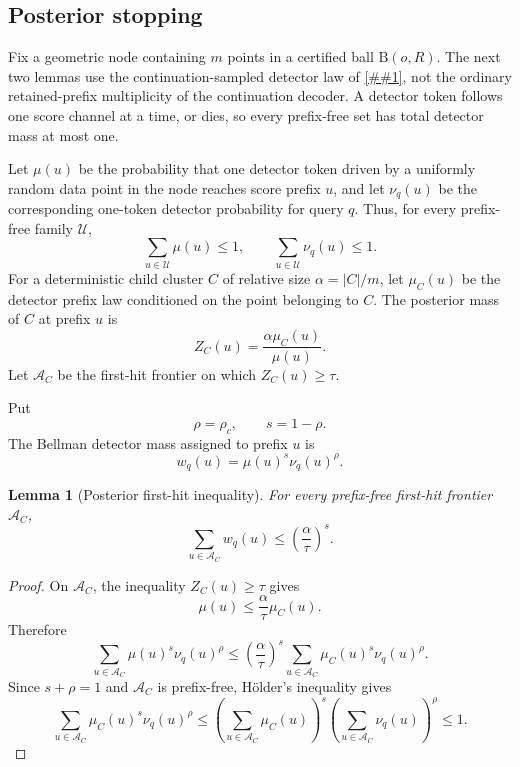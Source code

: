 \documentclass[10pt]{article}
\newcommand{\cref}[1]{\ref{##1}}
\newtheorem{lemma}[theorem]{Lemma}
\theoremstyle{definition}
\newcommand{\Ball}{\mathrm{B}}
\begin{document}
\subsection{Posterior stopping}

Fix a geometric node containing $m$ points in a certified ball $\Ball(o,R)$. The next two lemmas use the continuation-sampled detector law of \cref{lem:continuation-detector}, not the ordinary retained-prefix multiplicity of the continuation decoder. A detector token follows one score channel at a time, or dies, so every prefix-free set has total detector mass at most one.

Let $\mu(u)$ be the probability that one detector token driven by a uniformly random data point in the node reaches score prefix $u$, and let $\nu_q(u)$ be the corresponding one-token detector probability for query $q$. Thus, for every prefix-free family $\mathcal U$,
\[
   \sum_{u\in\mathcal U}\mu(u)\le1,
   \qquad
   \sum_{u\in\mathcal U}\nu_q(u)\le1.
\]
For a deterministic child cluster $C$ of relative size $\alpha=|C|/m$, let $\mu_C(u)$ be the detector prefix law conditioned on the point belonging to $C$. The posterior mass of $C$ at prefix $u$ is
\[
   Z_C(u)=\frac{\alpha\mu_C(u)}{\mu(u)}.
\]
Let $\mathcal A_C$ be the first-hit frontier on which $Z_C(u)\ge\tau$.

Put
\[
   \rho=\rho_c,
   \qquad
   s=1-\rho.
\]
The Bellman detector mass assigned to prefix $u$ is
\[
   w_q(u)=\mu(u)^s\nu_q(u)^\rho.
\]

\begin{lemma}[Posterior first-hit inequality]\label{lem:first-hit}
   For every prefix-free first-hit frontier $\mathcal A_C$,
   \[
      \sum_{u\in\mathcal A_C} w_q(u)
      \le
      \left(\frac{\alpha}{\tau}\right)^s.
   \]
\end{lemma}

\begin{proof}
   On $\mathcal A_C$, the inequality $Z_C(u)\ge\tau$ gives
   \[
      \mu(u)\le \frac{\alpha}{\tau}\mu_C(u).
   \]
   Therefore
   \[
      \sum_{u\in\mathcal A_C}\mu(u)^s\nu_q(u)^\rho
      \le
      \left(\frac{\alpha}{\tau}\right)^s
      \sum_{u\in\mathcal A_C}\mu_C(u)^s\nu_q(u)^\rho.
   \]
   Since $s+\rho=1$ and $\mathcal A_C$ is prefix-free, Hölder's inequality gives
   \[
      \sum_{u\in\mathcal A_C}\mu_C(u)^s\nu_q(u)^\rho
      \le
      \left(\sum_{u\in\mathcal A_C}\mu_C(u)\right)^s
      \left(\sum_{u\in\mathcal A_C}\nu_q(u)\right)^\rho
      \le1.
   \]
\end{proof}
\end{document}
